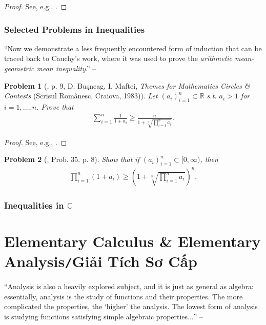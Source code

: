 \documentclass[oneside]{book}
\numberwithin{equation}{section}
\newtheorem{problem}{Problem}[section]
\begin{document}
\begin{proof}[Proof]
	See, e.g., \cite[pp. 38--39]{Gelca_Andreescu2017}.
\end{proof}
		
\subsection{Selected Problems in Inequalities}
``Now we demonstrate a less frequently encountered form of induction that can be traced back to Cauchy's work, where it was used to prove the \textit{arithmetic mean-geometric mean inequality}.'' -- \cite[p. 9]{Gelca_Andreescu2017}

\begin{problem}[\cite{Gelca_Andreescu2017}, p. 9, D. Buşneag, I. Maftei, \textit{Themes for Mathematics Circles \& Contests} (Scrisul Românesc, Craiova, 1983)]
	Let $(a_i)_{i=1}^n\subset\mathbb{R}$ s.t. $a_i > 1$ for $i = 1,\ldots,n$. Prove that
	\begin{align*}
		\sum_{i=1}^n \frac{1}{1 + a_i}\ge\frac{n}{1 + \sqrt[n]{\prod_{i=1}^n a_i}}.
	\end{align*}
\end{problem}

\begin{proof}[Proof]
	See, e.g., \cite[pp. 9--10]{Gelca_Andreescu2017}.
\end{proof}

\begin{problem}[\cite{Gelca_Andreescu2017}, Prob. 35. p. 8]
	Show that if $(a_i)_{i=1}^n\subset[0,\infty)$, then
	\begin{align*}
		\prod_{i=1}^n (1 + a_i)\ge\left(1 + \sqrt[n]{\prod_{i=1}^n a_i}\right)^n.
	\end{align*}
\end{problem}

\subsection{Inequalities in $\mathbb{C}$}


\chapter{Elementary Calculus \& Elementary Analysis\texttt{/}Giải Tích Sơ Cấp}
``Analysis is also a heavily explored subject, and it is just as general as algebra: essentially, analysis is the study of functions and their properties. The more complicated the properties, the `higher' the analysis. The lowest form of analysis is studying functions satisfying simple algebraic properties$\ldots$'' -- \cite[Chap. 3, p. 36]{Tao2006}
\end{document}
